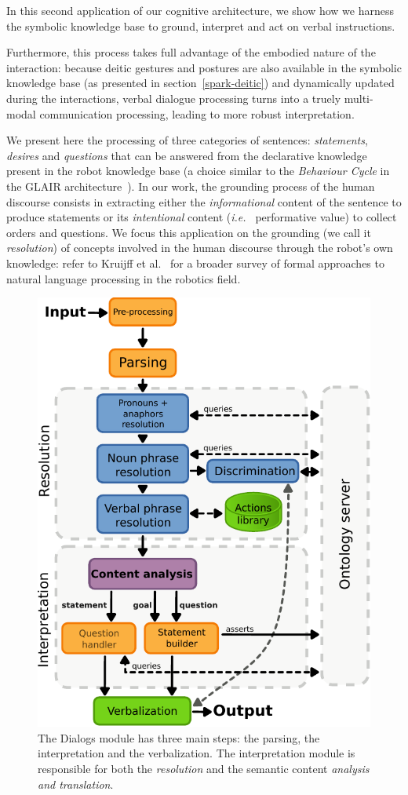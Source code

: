 \documentclass{svmult}
\newcommand{\ie}{{\textit{i.e.~}}}
\begin{document}
In this second application of our cognitive architecture, we show how we
harness the symbolic knowledge base to ground, interpret and act on verbal
instructions.

Furthermore, this process takes full advantage of the embodied nature of the
interaction: because deitic gestures and postures are also available in the
symbolic knowledge base (as presented in section~\ref{spark-deitic}) and
dynamically updated during the interactions, verbal dialogue processing turns
into a truely multi-modal communication processing, leading to more robust
interpretation.

We present here the processing of three categories of sentences:
\emph{statements}, \emph{desires} and \emph{questions} that can be answered
from the declarative knowledge present in the robot knowledge base (a choice
similar to the \emph{Behaviour Cycle} in the GLAIR
architecture~\cite{Shapiro2009}). In our work, the grounding process of the
human discourse consists in extracting either the \emph{informational} content
of the sentence to produce statements or its \emph{intentional} content (\ie
performative value) to collect orders and questions. We focus this application on the grounding (we call it
\emph{resolution}) of concepts involved in the human discourse through the
robot's own knowledge: refer to Kruijff et al.~\cite{Kruijff2010}
for a broader survey of formal approaches to natural language processing in the
robotics field.

\begin{figure}[!t]
\centering
  \includegraphics[width=0.7\linewidth]{figs/dialog_module_simple.pdf}
  \caption{The {\sc Dialogs} module has three main steps: the parsing,
  the interpretation and the verbalization. The interpretation module is
  responsible for both the \emph{resolution} and the semantic content
  \emph{analysis and translation}.} 
  \label{fig|dialog}
\end{figure}
\end{document}
